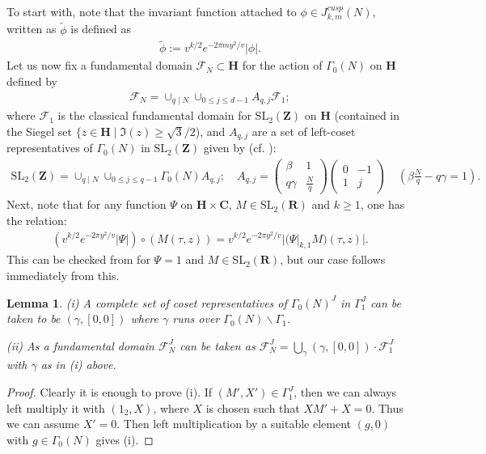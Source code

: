 \documentclass[11pt]{amsart}
\numberwithin{equation}{section}
\theoremstyle{plain}
\newtheorem{lem}[thm]{Lemma}
\theoremstyle{definition}
\newcommand{\C}{\mf C}
\newcommand{\h}{\mf H}
\newcommand{\mf}{\mathbf}
\newcommand{\mc}{\mathcal}
\newcommand{\mrm}{\mathrm}
\newcommand{\q}{\quad}
\newcommand{\n}{\nonumber}
\newcommand{\sltwo}{\mrm{SL}_2(\mf Z)}
\newcommand{\sltwor}{\mrm{SL}_2(\mf R)}
\begin{document}
To start with, note that the invariant function attached to $\phi\in J_{k,m}^{cusp}(N)$, written as $\widetilde{\phi}$ is defined as
\begin{align}
\widetilde{\phi} := v^{k/2} e^{- 2 \pi m y^2/v} |\phi|. \label{inva}
\end{align}
Let us now fix a fundamental domain $\mc F_N \subset \h$ for the action of $\Gamma_0(N) $ on $\h$ defined by 
\begin{align} \label{fndef}
\mc F_N = \cup_{q \mid N} \cup_{ 0 \le j \le d-1} A_{q,j} \mc F_1;
\end{align}
where $\mc F_1$ is the classical fundamental domain for $\sltwo$ on $\h$ (contained in the Siegel set $\{ z \in \h \mid \Im(z) \ge \sqrt{3}/2$), and $A_{q,j}$ are a set of left-coset representatives of $\Gamma_0(N)$ in $\sltwo$ given by (cf. \cite{AU}):
\begin{align} 
\sltwo = \cup_{q\mid N} \cup_{ 0 \le j \le q-1}  \Gamma_0(N)A_{q,j} ; \q A_{q,j} = \begin{pmatrix} \beta & 1 \\ q \gamma & \frac{N}{q}  \end{pmatrix} \begin{pmatrix}  0 & -1 \\  1 & j  \end{pmatrix} \q (\beta \frac{N}{q} - q \gamma =1). \n
\end{align}
Next, note that for any function $\Psi$ on $\h \times \C$, $M \in \sltwor $ and $k \ge 1$, one has the relation:
\begin{align} \label{inv}
\left( v^{k/2} e^{- 2 \pi y^2/v} |\Psi| \right) \circ (M(\tau,z))  = v^{k/2} e^{- 2 \pi y^2/v} | (\Psi |_{k,1} M ) (\tau,z)|.
\end{align}
This can be checked from \cite{sko-zag} for $\Psi=1$ and $M \in \sltwor$, but our case follows immediately from this. 

\begin{lem} \label{cosetj}
 (i) A complete set of coset representatives of $\Gamma_0(N)^J$ in $\Gamma_1^J$ can be taken to be $(\gamma, [0,0]) $ where $\gamma$ runs over $\Gamma_0(N) \backslash \Gamma_1$. 
 
 (ii) As a fundamental domain $\mc F_{N}^J$ can be taken as $\mc F^J_N= \bigcup_\gamma (\gamma, [0,0]) \cdot \mc F_1^J$ with $\gamma$ as in (i) above.
\end{lem}
\begin{proof}
    Clearly it is enough to prove (i). If $(M',X') \in \Gamma_1^J$, then we can always left multiply it with $(1_2,X)$, where $X$ is chosen such that $XM'+X=0$. Thus we can assume $X'=0$. Then left multiplication by a suitable element $(g,0)$ with $g \in \Gamma_0(N)$ gives (i).
\end{proof}
\end{document}
